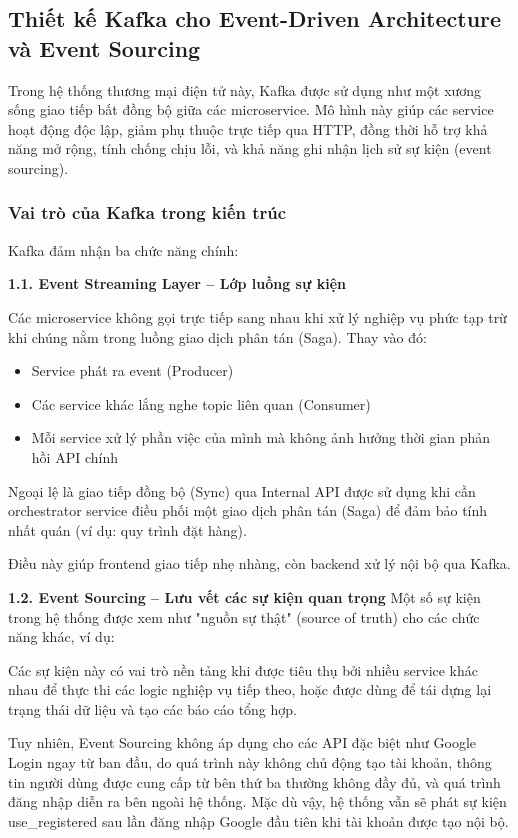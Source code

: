 \subsection{Thiết kế Kafka cho Event-Driven Architecture và Event Sourcing}

Trong hệ thống thương mại điện tử này, Kafka được sử dụng như một xương sống giao tiếp bất đồng bộ giữa các microservice. Mô hình này giúp các service hoạt động độc lập, giảm phụ thuộc trực tiếp qua HTTP, đồng thời hỗ trợ khả năng mở rộng, tính chống chịu lỗi, và khả năng ghi nhận lịch sử sự kiện (event sourcing).

\subsubsection{Vai trò của Kafka trong kiến trúc}

Kafka đảm nhận ba chức năng chính:

\textbf{1.1. Event Streaming Layer – Lớp luồng sự kiện}

Các microservice không gọi trực tiếp sang nhau khi xử lý nghiệp vụ phức tạp trừ khi chúng nằm trong luồng giao dịch phân tán (Saga). Thay vào đó:

\begin{itemize}
    \item Service phát ra event (Producer)
    \item Các service khác lắng nghe topic liên quan (Consumer)
    \item Mỗi service xử lý phần việc của mình mà không ảnh hưởng thời gian phản hồi API chính
\end{itemize}

Ngoại lệ là giao tiếp đồng bộ (Sync) qua Internal API được sử dụng khi cần orchestrator service điều phối một giao dịch phân tán (Saga) để đảm bảo tính nhất quán (ví dụ: quy trình đặt hàng).

Điều này giúp frontend giao tiếp nhẹ nhàng, còn backend xử lý nội bộ qua Kafka.

\textbf{1.2. Event Sourcing – Lưu vết các sự kiện quan trọng}
Một số sự kiện trong hệ thống được xem như "nguồn sự thật" (source of truth) cho các chức năng khác, ví dụ:

Các sự kiện này có vai trò nền tảng khi được tiêu thụ bởi nhiều service khác nhau để thực thi các logic nghiệp vụ tiếp theo, hoặc được dùng để tái dựng lại trạng thái dữ liệu và tạo các báo cáo tổng hợp.

Tuy nhiên, Event Sourcing không áp dụng cho các API đặc biệt như Google Login ngay từ ban đầu, do quá trình này không chủ động tạo tài khoản, thông tin người dùng được cung cấp từ bên thứ ba thường không đầy đủ, và quá trình đăng nhập diễn ra bên ngoài hệ thống. Mặc dù vậy, hệ thống vẫn sẽ phát sự kiện use\_registered sau lần đăng nhập Google đầu tiên khi tài khoản được tạo nội bộ.

